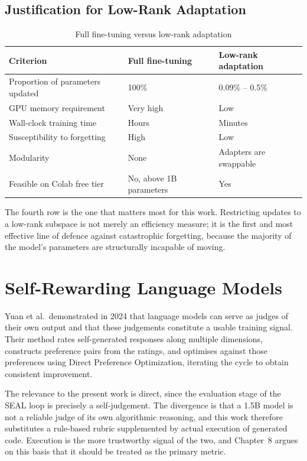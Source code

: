 \documentclass[12pt,a4paper]{report}
\begin{document}
\subsection{Justification for Low-Rank Adaptation}

\begin{table}[htbp]
\centering
\caption{Full fine-tuning versus low-rank adaptation}
\begin{tabular}{>{\raggedright\arraybackslash}p{4cm} p{4cm} p{4cm}}
\toprule
\textbf{Criterion} & \textbf{Full fine-tuning} & \textbf{Low-rank adaptation} \\
\midrule
Proportion of parameters updated & 100\% & 0.09\% -- 0.5\% \\
GPU memory requirement & Very high & Low \\
Wall-clock training time & Hours & Minutes \\
Susceptibility to forgetting & High & Low \\
Modularity & None & Adapters are swappable \\
Feasible on Colab free tier & No, above 1B parameters & Yes \\
\bottomrule
\end{tabular}
\end{table}

The fourth row is the one that matters most for this work. Restricting updates to a low-rank subspace is not merely an efficiency measure; it is the first and most effective line of defence against catastrophic forgetting, because the majority of the model's parameters are structurally incapable of moving.

\section{Self-Rewarding Language Models}

Yuan et al.~demonstrated in 2024 that language models can serve as judges of their own output and that these judgements constitute a usable training signal. Their method rates self-generated responses along multiple dimensions, constructs preference pairs from the ratings, and optimises against those preferences using Direct Preference Optimization, iterating the cycle to obtain consistent improvement.

The relevance to the present work is direct, since the evaluation stage of the SEAL loop is precisely a self-judgement. The divergence is that a 1.5B model is not a reliable judge of its own algorithmic reasoning, and this work therefore substitutes a rule-based rubric supplemented by actual execution of generated code. Execution is the more trustworthy signal of the two, and Chapter~8 argues on this basis that it should be treated as the primary metric.
\end{document}

